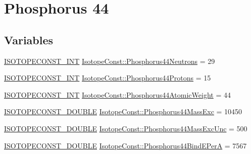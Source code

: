 \hypertarget{group___isotope_const-_phosphorus-_p44}{}\section{Phosphorus 44}
\label{group___isotope_const-_phosphorus-_p44}
\subsection*{Variables}
\begin{DoxyCompactItemize}
\item 
\mbox{\hyperlink{group___isotope_const-_macros_ga5f18360b3e99483a35c32d789e62621c}{I\+S\+O\+T\+O\+P\+E\+C\+O\+N\+S\+T\+\_\+\+I\+NT}} \mbox{\hyperlink{group___isotope_const-_phosphorus-_p44_gabb9f10bc98098a79ee463e62da0f572f}{Isotope\+Const\+::\+Phosphorus44\+Neutrons}} = 29
\item 
\mbox{\hyperlink{group___isotope_const-_macros_ga5f18360b3e99483a35c32d789e62621c}{I\+S\+O\+T\+O\+P\+E\+C\+O\+N\+S\+T\+\_\+\+I\+NT}} \mbox{\hyperlink{group___isotope_const-_phosphorus-_p44_ga09f0c5e8c7d167b66ed6ec061b24ab0f}{Isotope\+Const\+::\+Phosphorus44\+Protons}} = 15
\item 
\mbox{\hyperlink{group___isotope_const-_macros_ga5f18360b3e99483a35c32d789e62621c}{I\+S\+O\+T\+O\+P\+E\+C\+O\+N\+S\+T\+\_\+\+I\+NT}} \mbox{\hyperlink{group___isotope_const-_phosphorus-_p44_ga813cde5b85bcb0d060cfa6fc65786286}{Isotope\+Const\+::\+Phosphorus44\+Atomic\+Weight}} = 44
\item 
\mbox{\hyperlink{group___isotope_const-_macros_ga8f45a7272ce02c0b4c65c44636ed719a}{I\+S\+O\+T\+O\+P\+E\+C\+O\+N\+S\+T\+\_\+\+D\+O\+U\+B\+LE}} \mbox{\hyperlink{group___isotope_const-_phosphorus-_p44_ga8b946d3ce85d61e38b216a65373f3b81}{Isotope\+Const\+::\+Phosphorus44\+Mass\+Exc}} = 10450
\item 
\mbox{\hyperlink{group___isotope_const-_macros_ga8f45a7272ce02c0b4c65c44636ed719a}{I\+S\+O\+T\+O\+P\+E\+C\+O\+N\+S\+T\+\_\+\+D\+O\+U\+B\+LE}} \mbox{\hyperlink{group___isotope_const-_phosphorus-_p44_ga5c053b962feff02629de133b6f36537d}{Isotope\+Const\+::\+Phosphorus44\+Mass\+Exc\+Unc}} = 500
\item 
\mbox{\hyperlink{group___isotope_const-_macros_ga8f45a7272ce02c0b4c65c44636ed719a}{I\+S\+O\+T\+O\+P\+E\+C\+O\+N\+S\+T\+\_\+\+D\+O\+U\+B\+LE}} \mbox{\hyperlink{group___isotope_const-_phosphorus-_p44_gaeffa4be53d8e2e99e318824c5b758484}{Isotope\+Const\+::\+Phosphorus44\+Bind\+E\+PerA}} = 7567
\item 

\end{DoxyCompactItemize}
